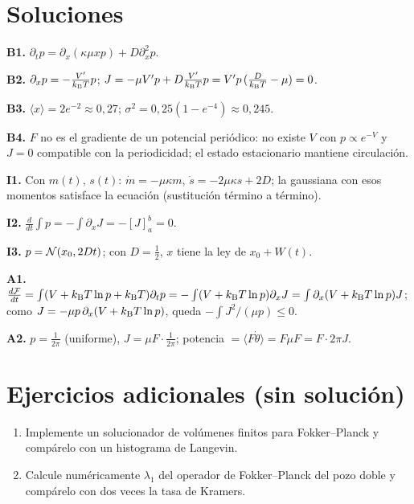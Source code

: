 \documentclass[11pt,a4paper]{article}
\begin{document}
\section{Soluciones}
\begin{solucion}
\textbf{B1.} $\partial_tp=\partial_x(\kappa\mu xp)+D\partial_x^2p$.

\textbf{B2.} $\partial_xp=-\frac{V'}{k_{\mathrm B} T}p$; $J=-\mu V'p+D\frac{V'}{k_{\mathrm B} T}p=V'p\,(\frac{D}{k_{\mathrm B} T}-\mu)=0$.

\textbf{B3.} $\langle x\rangle=2e^{-2}\approx0{,}27$; $\sigma^2=0{,}25(1-e^{-4})\approx0{,}245$.

\textbf{B4.} $F$ no es el gradiente de un potencial periódico: no existe $V$ con $p\propto e^{-V}$ y $J=0$ compatible con la periodicidad; el estado estacionario mantiene circulación.

\textbf{I1.} Con $m(t)$, $s(t)$: $\dot m=-\mu\kappa m$, $\dot s=-2\mu\kappa s+2D$; la gaussiana con esos momentos satisface la ecuación (sustitución término a término).

\textbf{I2.} $\frac{d}{dt}\int p=-\int\partial_xJ=-[J]_{a}^{b}=0$.

\textbf{I3.} $p=\mathcal{N}(x_0,2Dt)$; con $D=\frac12$, $x$ tiene la ley de $x_0+W(t)$.

\textbf{A1.} $\frac{d\mathcal F}{dt}=\int(V+k_{\mathrm B} T\ln p+k_{\mathrm B} T)\partial_tp=-\int(V+k_{\mathrm B} T\ln p)\partial_xJ=\int\partial_x(V+k_{\mathrm B} T\ln p)J$; como $J=-\mu p\,\partial_x(V+k_{\mathrm B} T\ln p)$, queda $-\int J^2/(\mu p)\le0$.

\textbf{A2.} $p=\frac1{2\pi}$ (uniforme), $J=\mu F\cdot\frac1{2\pi}$; potencia $=\langle F\dot\theta\rangle=F\mu F=F\cdot2\pi J$.
\end{solucion}

\section{Ejercicios adicionales (sin solución)}
\begin{enumerate}[label=\textbf{P\arabic*.}]
\item Implemente un solucionador de volúmenes finitos para Fokker--Planck y compárelo con un histograma de Langevin.
\item Calcule numéricamente $\lambda_1$ del operador de Fokker--Planck del pozo doble y compárelo con dos veces la tasa de Kramers.
\end{enumerate}
\end{document}
